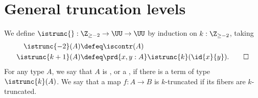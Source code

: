 \begin{comment}
\begin{thm}[Hedberg]\label{thm:dec_eq}
Any type with decidable equality is a set.
\end{thm}

\begin{proof}
Let $A$ be a type, and let $d:\prd{x,y:A}(\id{x}{y})+\neg(\id{x}{y})$ be the witness that $A$ has decidable equality.
We first construct a reflexive binary relation $E:A\to A\to\type$ such that each $E(x,y)$ is a proposition.
For every $x,y:A$, we first define a type family $E'(x,y):((\id{x}{y})+\neg(\id{x}{y}))\to\type$ by
\begin{align*}
E'(x,y,\inl(p)) & \defeq \unit \\
E'(x,y,\inr(p)) & \defeq \emptyt.
\end{align*}
Note that $E'(x,y,q)$ is a proposition for each $x,y:A$ and $q:(\id{x}{y})+\neg(\id{x}{y})$. 
Now we set $E(x,y)\defeq E'(x,y,d(x,y))$. Then $E$ is clearly reflexive, and a family of propositions.
Therefore it remains to show that $E$ implies identity. 

Since $E$ is defined as an instance of $E'$, it suffices to construct a term of type
\begin{equation*}
\prd{x,y:A}{q:(\id{x}{y})+\neg(\id{x}{y})} E'(q)\to (\id{x}{y}). 
\end{equation*}
By induction of disjoint sums, it suffices to construct terms of types
\begin{align*}
& \prd{x,y:A}{p:\id{x}{y}} \unit\to (\id{x}{y}) \\
& \prd{x,y:A}{p:\neg(\id{x}{y})} \emptyt\to (\id{x}{y}).
\end{align*}
In the first case, we take $\lam{x}{y}{p}{t}p$, and the second case is by induction on the empty type.
\end{proof}
\end{comment}

\section{General truncation levels}
\begin{defn}
We define $\istrunc{} : \Z_{\geq-2}\to\UU\to\UU$ by induction on $k:\Z_{\geq -2}$, taking
\begin{align*}
\istrunc{-2}(A) & \defeq \iscontr(A) \\
\istrunc{k+1}(A) & \defeq \prd{x,y:A}\istrunc{k}(\id{x}{y}).\qedhere
\end{align*}
For any type $A$, we say that $A$ is , or a , if there is a term of type $\istrunc{k}(A)$. We say that a map $f:A\to B$ is $k$-truncated if its fibers are $k$-truncated.
\end{defn}

